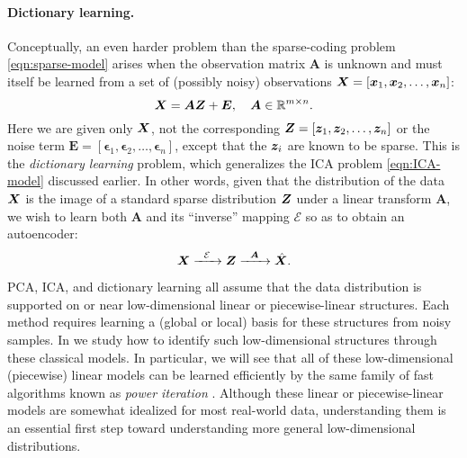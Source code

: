 \documentclass[../../book-main.tex]{subfiles}
\begin{document}
\paragraph{Dictionary learning.}
Conceptually, an even harder problem than the sparse-coding problem \eqref{eqn:sparse-model} arises when the observation matrix $\boldsymbol{A}$ is unknown and must itself be learned from a set of (possibly noisy) observations $\bm{X} = [\bm{x}_1, \bm{x}_2, \ldots, \bm{x}_n]$:
\begin{equation}
    \bm{X} = \boldsymbol{A} \bm{Z} + \boldsymbol{E}, \quad \boldsymbol{A} \in \mathbb{R}^{m\times n}.
    \label{eqn:dictionary-learning}
\end{equation}
Here we are given only $\bm{X}$, not the corresponding $\bm{Z} = [\bm{z}_1, \bm{z}_2, \ldots, \bm{z}_n]$ or the noise term $\boldsymbol{E}= [\boldsymbol{\epsilon}_1, \boldsymbol{\epsilon}_2, \ldots, \boldsymbol{\epsilon}_n]$, except that the $\bm{z}_i$ are known to be sparse. This is the {\em dictionary learning} problem, which generalizes the ICA problem \eqref{eqn:ICA-model} discussed earlier. In other words, given that the distribution of the data $\bm{X}$ is the image of a standard sparse distribution $\bm{Z}$ under a linear transform $\boldsymbol{A}$, we wish to learn both $\boldsymbol{A}$ and its ``inverse'' mapping $\mathcal{E}$ so as to obtain an autoencoder:
\begin{equation}
    \bm{X}   \xrightarrow{\hspace{2mm} \mathcal{E}\hspace{2mm}}  \bm{Z} \xrightarrow{\hspace{2mm} \boldsymbol{A} \hspace{2mm}} \hat{\bm{X}}.
       \label{eqn:decoding-DL}
\end{equation}

PCA, ICA, and dictionary learning all assume that the data distribution is supported on or near low-dimensional linear or piecewise-linear structures. Each method requires learning a (global or local) basis for these structures from noisy samples. In  we study how to identify such low-dimensional structures through these classical models. In particular, we will see that all of these low-dimensional (piecewise) linear models can be learned efficiently by the same family of fast algorithms known as {\em power iteration} \cite{Zhai-2020}. Although these linear or piecewise-linear models are somewhat idealized for most real-world data, understanding them is an essential first step toward understanding more general low-dimensional distributions.
\end{document}
